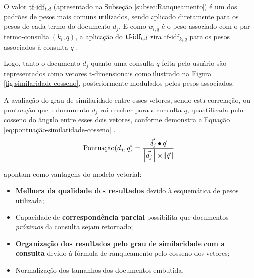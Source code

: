     O valor $\text{tf-idf}_{\text{\textit{t},\textit{d}}}$ (apresentado na Subseção \ref{subsec:Ranqueamento}) é um dos padrões de pesos mais comuns utilizados, sendo aplicado diretamente para os pesos de cada termo do documento $d_j$.
    E como $w_{i,q}$ é o peso associado com o par termo-consulta $(k_i, q)$, a aplicação do $\text{tf-idf}_{\text{\textit{t},\textit{d}}}$ vira $\text{tf-idf}_{k_i\text{,}\textit{q}}$ para os pesos associados à consulta $q$ \cite[p.~77--78]{Baeza-Yates2011}.
    
    Logo, tanto o documento $d_j$ quanto uma consulta $q$ feita pelo usuário são representados como vetores t-dimensionais como ilustrado na Figura \ref{fig:similaridade-cosseno}, posteriormente modulados pelos pesos associados.
    
    
    
    A avaliação do grau de similaridade entre esses vetores, sendo esta correlação, ou pontuação que o documento $d_j$ vai receber para a consulta $q$, quantificada pelo cosseno do ângulo entre esses dois vetores, conforme demonstra a Equação \ref{eq:pontuação-similaridade-cosseno} \cite[p.~78]{Baeza-Yates2011}.
    \begin{equation}
        \label{eq:pontuação-similaridade-cosseno}
		\text{Pontuação}(\vec{d_j}, \vec{q}) = \frac{\vec{d_j} \bullet \vec{q} }{ \norm{\vec{d_j}} \times \norm{\vec{q}} }
    \end{equation}

    
     apontam como vantagens do modelo vetorial:
    \begin{itemize}
        \item \textbf{Melhora da qualidade dos resultados} devido à esquemática de pesos utilizada;
        \item Capacidade de \textbf{correspondência parcial} possibilita que documentos \textit{próximos} da consulta sejam retornado;
        \item \textbf{Organização dos resultados pelo grau de similaridade com a consulta} devido à fórmula de ranqueamento pelo cosseno dos vetores;
        \item Normalização dos tamanhos dos documentos embutida.
    \end{itemize}
    
